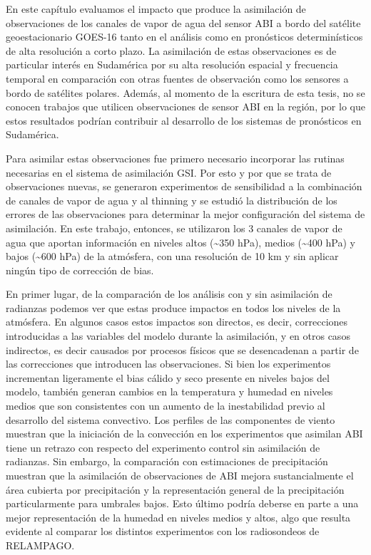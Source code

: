 \documentclass[12pt,oneside,a4paper]{reedthesis}
\begin{document}
En este capítulo evaluamos el impacto que produce la asimilación de observaciones de los canales de vapor de agua del sensor ABI a bordo del satélite geoestacionario GOES-16 tanto en el análisis como en pronósticos determinísticos de alta resolución a corto plazo. La asimilación de estas observaciones es de particular interés en Sudamérica por su alta resolución espacial y frecuencia temporal en comparación con otras fuentes de observación como los sensores a bordo de satélites polares. Además, al momento de la escritura de esta tesis, no se conocen trabajos que utilicen observaciones de sensor ABI en la región, por lo que estos resultados podrían contribuir al desarrollo de los sistemas de pronósticos en Sudamérica.

Para asimilar estas observaciones fue primero necesario incorporar las rutinas necesarias en el sistema de asimilación GSI. Por esto y por que se trata de observaciones nuevas, se generaron experimentos de sensibilidad a la combinación de canales de vapor de agua y al thinning y se estudió la distribución de los errores de las observaciones para determinar la mejor configuración del sistema de asimilación. En este trabajo, entonces, se utilizaron los 3 canales de vapor de agua que aportan información en niveles altos (\textasciitilde350 hPa), medios (\textasciitilde400 hPa) y bajos (\textasciitilde600 hPa) de la atmósfera, con una resolución de 10 km y sin aplicar ningún tipo de corrección de bias.

En primer lugar, de la comparación de los análisis con y sin asimilación de radianzas podemos ver que estas produce impactos en todos los niveles de la atmósfera. En algunos casos estos impactos son directos, es decir, correcciones introducidas a las variables del modelo durante la asimilación, y en otros casos indirectos, es decir causados por procesos físicos que se desencadenan a partir de las correcciones que introducen las observaciones. Si bien los experimentos incrementan ligeramente el bias cálido y seco presente en niveles bajos del modelo, también generan cambios en la temperatura y humedad en niveles medios que son consistentes con un aumento de la inestabilidad previo al desarrollo del sistema convectivo. Los perfiles de las componentes de viento muestran que la iniciación de la convección en los experimentos que asimilan ABI tiene un retrazo con respecto del experimento control sin asimilación de radianzas. Sin embargo, la comparación con estimaciones de precipitación muestran que la asimilación de observaciones de ABI mejora sustancialmente el área cubierta por precipitación y la representación general de la precipitación particularmente para umbrales bajos. Esto último podría deberse en parte a una mejor representación de la humedad en niveles medios y altos, algo que resulta evidente al comparar los distintos experimentos con los radiosondeos de RELAMPAGO.
\end{document}
